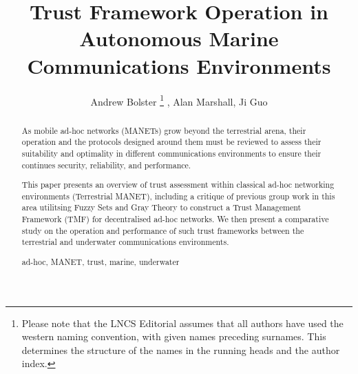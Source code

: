 \documentclass[runningheads,a4paper]{llncs}
\newcommand{\keywords}[1]{\par\addvspace\baselineskip
\noindent\keywordname\enspace\ignorespaces#1}
\begin{document}
\mainmatter  %

\title{Trust Framework Operation in Autonomous Marine Communications Environments}


%
%
\author{Andrew Bolster%
\thanks{Please note that the LNCS Editorial assumes that all authors have used
the western naming convention, with given names preceding surnames. This determines
the structure of the names in the running heads and the author index.}
, Alan Marshall, Ji Guo}
%


\maketitle


\begin{abstract}
  As mobile ad-hoc networks (MANETs) grow beyond the terrestrial arena, their operation and the protocols designed around them must be reviewed to assess their suitability and optimality in different communications environments to ensure their continues security, reliability, and performance.

  This paper presents an overview of trust assessment within classical ad-hoc networking environments (Terrestrial MANET), including a critique of previous group work in this area utilitsing Fuzzy Sets and Gray Theory to construct a Trust Management Framework (TMF) for decentralised ad-hoc networks. We then present a comparative study on the operation and performance of such trust frameworks between the terrestrial and underwater communications environments.
\keywords{ad-hoc, MANET, trust, marine, underwater}
\end{abstract}
\end{document}
